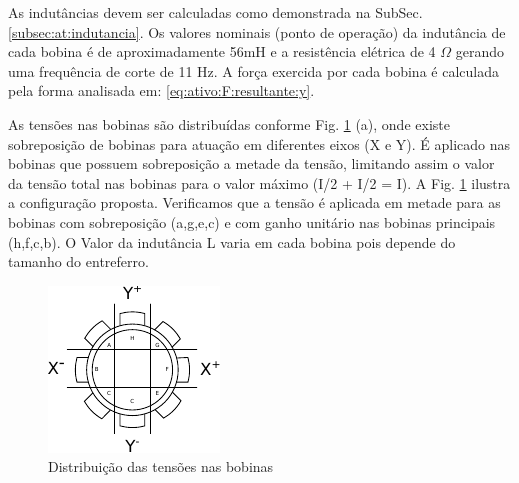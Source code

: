 As indutâncias devem ser calculadas como demonstrada na SubSec. \ref{subsec:at:indutancia}. Os valores nominais (ponto de operação) da indutância de cada bobina é de aproximadamente 56mH e a resistência elétrica de 4 $\Omega$ gerando uma frequência de corte de 11 Hz. A força exercida por cada bobina é calculada pela forma analisada em: \eqref{eq:ativo:F:resultante:y}.


As tensões nas bobinas são distribuídas conforme Fig. \ref{fig:blocos:tensao:bobinas:x:y} (a), onde existe sobreposição de bobinas para atuação em diferentes eixos (X e Y). É aplicado nas bobinas que possuem sobreposição a metade da tensão, limitando assim o valor da tensão total nas bobinas para o valor máximo (I/2 + I/2 = I). A Fig. \ref{fig:blocos:tensao:bobinas:x:y} ilustra a configuração proposta. Verificamos que a tensão é aplicada em metade para as bobinas com sobreposição (a,g,e,c) e com ganho unitário nas bobinas principais (h,f,c,b). O Valor da indutância L varia em cada bobina pois depende do tamanho do entreferro.


\begin{figure}[th]
\centering
\includegraphics[width=0.5\linewidth]{./Figs/Modelagem/ativo-atuadores-conexao}
%
\caption{Distribuição das tensões nas bobinas}
\label{fig:blocos:tensao:bobinas:x:y}
\end{figure}

